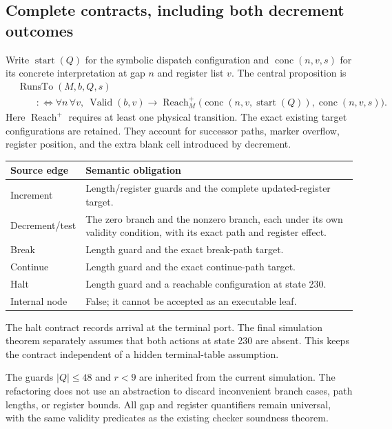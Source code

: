 \documentclass[11pt,letterpaper]{article}
\newcommand{\Reachp}{\operatorname{Reach}^{+}}
\begin{document}
\subsection{Complete contracts, including both decrement outcomes}

Write $\operatorname{start}(Q)$ for the symbolic dispatch configuration and
$\operatorname{conc}(n,v,s)$ for its concrete interpretation at gap $n$ and
register list $v$. The central proposition is
\begin{align*}
 &\operatorname{RunsTo}(M,b,Q,s)\\
 &\qquad:\!\Longleftrightarrow
 \forall n\,\forall v,\ \operatorname{Valid}(b,v)\to
 \Reachp_M\bigl(\operatorname{conc}(n,v,\operatorname{start}(Q)),
                  \operatorname{conc}(n,v,s)\bigr).
\end{align*}
Here $\Reachp$ requires at least one physical transition. The exact existing
target configurations are retained. They account for successor paths, marker
overflow, register position, and the extra blank cell introduced by decrement.

\begin{center}
\begin{tabular}{p{}p{}}
\toprule
Source edge & Semantic obligation\\
\midrule
Increment & Length/register guards and the complete updated-register target.\\
Decrement/test & The zero branch and the nonzero branch, each under its own
validity condition, with its exact path and register effect.\\
Break & Length guard and the exact break-path target.\\
Continue & Length guard and the exact continue-path target.\\
Halt & Length guard and a reachable configuration at state 230.\\
Internal node & False; it cannot be accepted as an executable leaf.\\
\bottomrule
\end{tabular}
\end{center}

The halt contract records arrival at the terminal port. The final simulation
theorem separately assumes that both actions at state 230 are absent. This keeps
the contract independent of a hidden terminal-table assumption.

The guards $|Q|\leq48$ and $r<9$ are inherited from the current simulation. The
refactoring does not use an abstraction to discard inconvenient branch cases,
path lengths, or register bounds. All gap and register quantifiers remain
universal, with the same validity predicates as the existing checker soundness
theorem.
\end{document}
